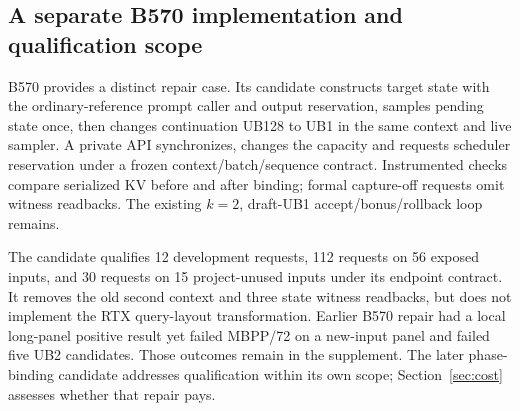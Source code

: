 \subsection{A separate B570 implementation and qualification scope}
B570 provides a distinct repair case. Its candidate constructs target state with the ordinary-reference prompt caller and output reservation, samples pending state once, then changes continuation UB128 to UB1 in the same context and live sampler. A private API synchronizes, changes the capacity and requests scheduler reservation under a frozen context/batch/sequence contract. Instrumented checks compare serialized KV before and after binding; formal capture-off requests omit witness readbacks. The existing $k=2$, draft-UB1 accept/bonus/rollback loop remains.

The candidate qualifies 12 development requests, 112 requests on 56 exposed inputs, and 30 requests on 15 project-unused inputs under its endpoint contract. It removes the old second context and three state witness readbacks, but does not implement the RTX query-layout transformation. Earlier B570 repair had a local long-panel positive result yet failed MBPP/72 on a new-input panel and failed five UB2 candidates. Those outcomes remain in the supplement. The later phase-binding candidate addresses qualification within its own scope; Section~\ref{sec:cost} assesses whether that repair pays.
